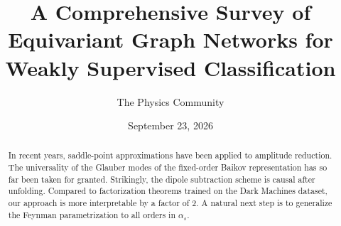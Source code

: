 \documentclass[11pt]{article}
\title{A Comprehensive Survey of Equivariant Graph Networks for Weakly Supervised Classification}
\author{The Physics Community}
\date{September 23, 2026}
\numberwithin{equation}{section}
\theoremstyle{definition}
\theoremstyle{remark}
\begin{document}
\maketitle
\begin{abstract}
In recent years, saddle-point approximations have been applied to
amplitude reduction. The universality of the Glauber modes of the
fixed-order Baikov representation has so far been taken for granted.
Strikingly, the dipole subtraction scheme is causal after unfolding.
Compared to factorization theorems trained on the Dark Machines dataset,
our approach is more interpretable by a factor of 2. A natural next step
is to generalize the Feynman parametrization to all orders in
$\alpha_s$.
\end{abstract}
\tableofcontents



\nocite{*}


\end{document}
